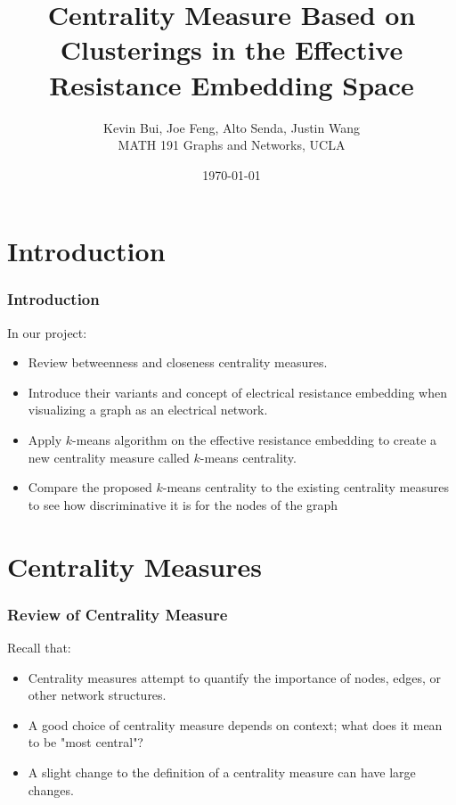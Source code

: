 \documentclass{beamer}
\title{Centrality Measure Based on Clusterings in the Effective Resistance Embedding Space}
\author{Kevin Bui, Joe Feng, Alto Senda, Justin Wang\\
\vspace{5mm}
MATH 191 Graphs and Networks, UCLA}
\date{ \today}
\begin{document}
\newtheorem{theo}{Theorem}
\newtheorem{lem}{Lemma}
\newtheorem{defin}{Definition}
\newtheorem{prop}{Proposition}
\newtheorem{ex}{Example}
\newtheorem{alg}{Algorithm}
\newtheorem{cor}{Corollary}
\newtheorem{case}{Case}


\begin{frame}
  \titlepage
\end{frame}



\section{Introduction}

\begin{frame}
     \frametitle{Introduction}
In our project:
\begin{itemize}
\item Review betweenness and closeness centrality measures.
\item Introduce their variants and concept of electrical resistance embedding when visualizing a graph as an electrical network.
\item Apply $k$-means algorithm on the effective resistance embedding to create a new centrality measure called $k$-means centrality.
\item Compare the proposed $k$-means centrality to the existing centrality measures to see how discriminative it is for the nodes of the graph 
\end{itemize}

\end{frame}


\section{Centrality Measures}    \label{sec:ourWork}

\begin{frame}
     \frametitle{Review of Centrality Measure}
Recall that:
\begin{itemize}
\item Centrality measures attempt to quantify the importance of nodes, edges, or other network structures.
\item A good choice of centrality measure depends on context; what does it mean to be "most central"?
\item A slight change to the definition of a centrality measure can have large changes.
\end{itemize}
\end{frame}
\end{document}
